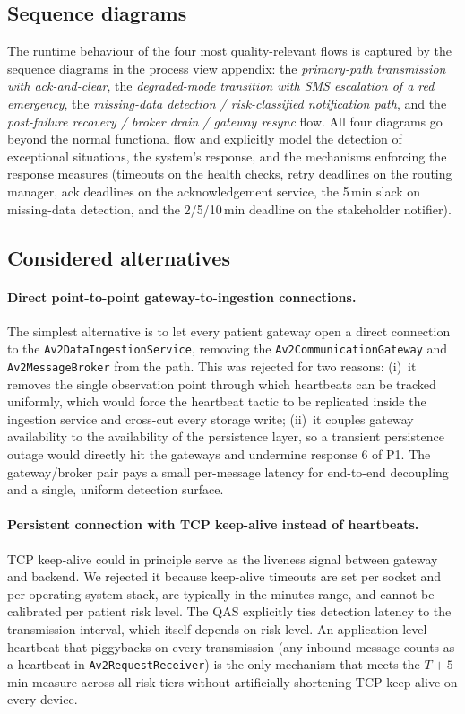 \subsection*{Sequence diagrams}
The runtime behaviour of the four most quality-relevant flows is captured
by the sequence diagrams in the process view appendix: the
\emph{primary-path transmission with ack-and-clear}, the
\emph{degraded-mode transition with SMS escalation of a red emergency},
the \emph{missing-data detection / risk-classified notification path},
and the \emph{post-failure recovery / broker drain / gateway resync} flow.
All four diagrams go beyond the normal functional flow and explicitly
model the detection of exceptional situations, the system's response, and
the mechanisms enforcing the response measures (timeouts on the health
checks, retry deadlines on the routing manager, ack deadlines on the
acknowledgement service, the 5\,min slack on missing-data detection, and
the 2/5/10\,min deadline on the stakeholder notifier).

\subsection*{Considered alternatives}

\paragraph{Direct point-to-point gateway-to-ingestion connections.}
The simplest alternative is to let every patient gateway open a direct
connection to the \texttt{Av2DataIngestionService}, removing the
\texttt{Av2CommunicationGateway} and \texttt{Av2MessageBroker} from the
path. This was rejected for two reasons: (i)~it removes the single
observation point through which heartbeats can be tracked uniformly, which
would force the heartbeat tactic to be replicated inside the ingestion
service and cross-cut every storage write; (ii)~it couples gateway
availability to the availability of the persistence layer, so a transient
persistence outage would directly hit the gateways and undermine response 6
of P1. The gateway/broker pair pays a small per-message latency for
end-to-end decoupling and a single, uniform detection surface.

\paragraph{Persistent connection with TCP keep-alive instead of
heartbeats.}
TCP keep-alive could in principle serve as the liveness signal between
gateway and backend. We rejected it because keep-alive timeouts are set
per socket and per operating-system stack, are typically in the minutes
range, and cannot be calibrated per patient risk level. The QAS explicitly
ties detection latency to the transmission interval, which itself depends
on risk level. An application-level heartbeat that piggybacks on every
transmission (any inbound message counts as a heartbeat in
\texttt{Av2RequestReceiver}) is the only mechanism that meets the
$T{+}5$\,min measure across all risk tiers without artificially shortening
TCP keep-alive on every device.

